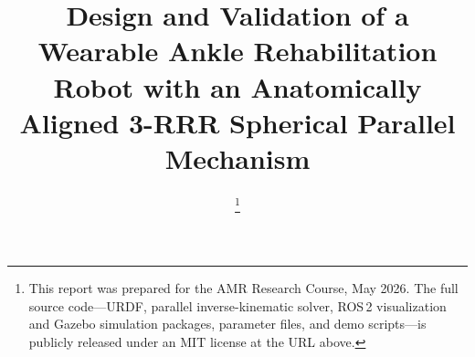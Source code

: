 \documentclass[conference]{IEEEtran}
\begin{document}
\title{Design and Validation of a Wearable Ankle Rehabilitation Robot with an Anatomically Aligned 3-RRR Spherical Parallel Mechanism}

\author{
\thanks{This report was prepared for the AMR Research Course, May 2026. The full source code---URDF, parallel inverse-kinematic solver, ROS\,2 visualization and Gazebo simulation packages, parameter files, and demo scripts---is publicly released under an MIT license at the URL above.}
}

\maketitle
\end{document}
